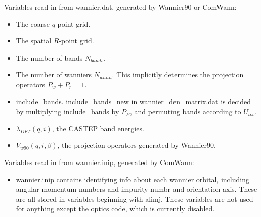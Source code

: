 \documentclass[aps,prb,singlecolumn,preprintnumbers,amsmath,amssymb]{revtex4}
\begin{document}
\begin{itemize}
\end{itemize}


Variables read in from wannier.dat, generated by Wannier90 or ComWann:
\begin{itemize}
\item The coarse $q$-point grid. %
\item The spatial $R$-point grid. %
\item The number of bands $N_{bands}$. %
\item The number of wanniers $N_{wann}$.  This implicitly determines the projection operators $P_w + P_r = 1$. %
\item include\_bands. include\_bands\_new in wannier\_den\_matrix.dat is decided by multiplying include\_bands by $P_E$, and permuting bands according to $U_{tob}$.  %
\item $\lambda_{DFT}(q,i) $, the CASTEP band energies. %
\item $V_{w90}(q,i,\beta)$, the projection operators generated by Wannier90. %
\end{itemize}

Variables read in from wannier.inip, generated by ComWann:
\begin{itemize}
\item wannier.inip contains identifying info about each wannier orbital, including angular momentum numbers and impurity numbr and orientation axis.  These are all stored in variables beginning with alimj. These variables are not used for anything except the optics  code, which is currently disabled.
\end{itemize}
\end{document}
